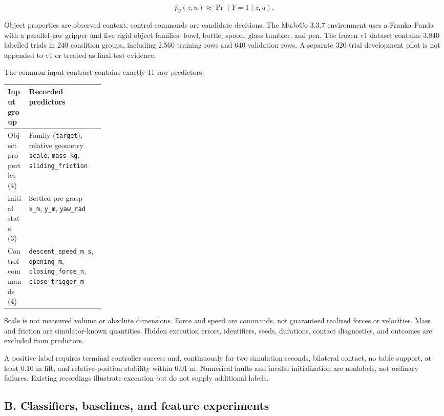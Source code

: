 \documentclass[11pt,letterpaper]{article}
\begin{document}
\[
\widehat p_\theta(z,u) \approx \Pr(Y=1\mid z,u).
\]

Object properties are observed context; control commands are candidate decisions. The MuJoCo 3.3.7 environment uses a Franka Panda with a parallel-jaw gripper and five rigid object families: bowl, bottle, spoon, glass tumbler, and pen. The frozen v1 dataset contains 3,840 labelled trials in 240 condition groups, including 2,560 training rows and 640 validation rows. A separate 320-trial development pilot is not appended to v1 or treated as final-test evidence.

The common input contract contains exactly 11 raw predictors:

\begin{center}\small\begin{tabularx}{\linewidth}{@{}p{0.22\linewidth}Y@{}}\toprule

\textbf{Input group} & \textbf{Recorded predictors}\\\midrule

Object properties (4) & Family (\texttt{target}), relative geometry \texttt{scale}, \texttt{mass\_kg}, \texttt{sliding\_friction}\\

Initial state (3) & Settled pre-grasp \texttt{x\_m}, \texttt{y\_m}, \texttt{yaw\_rad}\\

Control commands (4) & \texttt{descent\_speed\_m\_s}, \texttt{opening\_m}, \texttt{closing\_force\_n}, \texttt{close\_trigger\_m}\\

\bottomrule\end{tabularx}\end{center}

Scale is not measured volume or absolute dimensions. Force and speed are commands, not guaranteed realized forces or velocities. Mass and friction are simulator-known quantities. Hidden execution errors, identifiers, seeds, durations, contact diagnostics, and outcomes are excluded from predictors.

A positive label requires terminal controller success and, continuously for two simulation seconds, bilateral contact, no table support, at least 0.10 m lift, and relative-position stability within 0.01 m. Numerical faults and invalid initialization are nonlabels, not ordinary failures. Existing recordings illustrate execution but do not supply additional labels.

\subsection*{B. Classifiers, baselines, and feature experiments}
\end{document}
